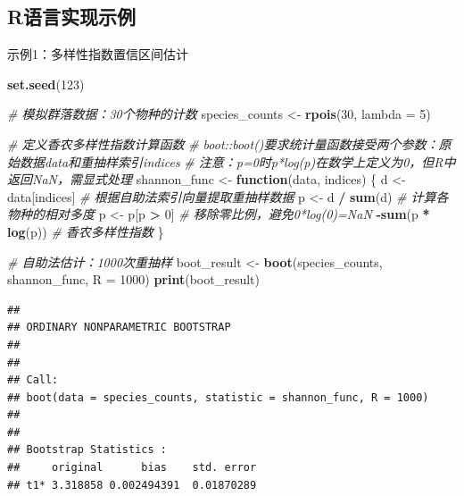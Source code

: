 \documentclass[
  twoside,12pt,fontset=none]{ctexbook}
\newenvironment{Shaded}{\begin{snugshade}}{\end{snugshade}}
\newcommand{\AttributeTok}[1]{\textcolor[rgb]{0.13,0.29,0.53}{#1}}
\newcommand{\CommentTok}[1]{\textcolor[rgb]{0.56,0.35,0.01}{\textit{#1}}}
\newcommand{\ControlFlowTok}[1]{\textcolor[rgb]{0.13,0.29,0.53}{\textbf{#1}}}
\newcommand{\DecValTok}[1]{\textcolor[rgb]{0.00,0.00,0.81}{#1}}
\newcommand{\FunctionTok}[1]{\textcolor[rgb]{0.13,0.29,0.53}{\textbf{#1}}}
\newcommand{\NormalTok}[1]{#1}
\newcommand{\OtherTok}[1]{\textcolor[rgb]{0.56,0.35,0.01}{#1}}
\newcommand{\SpecialCharTok}[1]{\textcolor[rgb]{0.81,0.36,0.00}{\textbf{#1}}}
\begin{document}
\hypertarget{rux8bedux8a00ux5b9eux73b0ux793aux4f8b-1}{%
\subsection{R语言实现示例}\label{rux8bedux8a00ux5b9eux73b0ux793aux4f8b-1}}

示例1：多样性指数置信区间估计

\begin{Shaded}
\begin{Highlighting}[]
\FunctionTok{set.seed}\NormalTok{(}\DecValTok{123}\NormalTok{)}

\CommentTok{\# 模拟群落数据：30个物种的计数}
\NormalTok{species\_counts }\OtherTok{\textless{}{-}} \FunctionTok{rpois}\NormalTok{(}\DecValTok{30}\NormalTok{, }\AttributeTok{lambda =} \DecValTok{5}\NormalTok{)}

\CommentTok{\# 定义香农多样性指数计算函数}
\CommentTok{\# boot::boot()要求统计量函数接受两个参数：原始数据data和重抽样索引indices}
\CommentTok{\# 注意：p=0时p*log(p)在数学上定义为0，但R中返回NaN，需显式处理}
\NormalTok{shannon\_func }\OtherTok{\textless{}{-}} \ControlFlowTok{function}\NormalTok{(data, indices) \{}
\NormalTok{  d }\OtherTok{\textless{}{-}}\NormalTok{ data[indices]             }\CommentTok{\# 根据自助法索引向量提取重抽样数据}
\NormalTok{  p }\OtherTok{\textless{}{-}}\NormalTok{ d }\SpecialCharTok{/} \FunctionTok{sum}\NormalTok{(d)                }\CommentTok{\# 计算各物种的相对多度}
\NormalTok{  p }\OtherTok{\textless{}{-}}\NormalTok{ p[p }\SpecialCharTok{\textgreater{}} \DecValTok{0}\NormalTok{]                  }\CommentTok{\# 移除零比例，避免0*log(0)=NaN}
  \SpecialCharTok{{-}}\FunctionTok{sum}\NormalTok{(p }\SpecialCharTok{*} \FunctionTok{log}\NormalTok{(p))               }\CommentTok{\# 香农多样性指数}
\NormalTok{\}}

\CommentTok{\# 自助法估计：1000次重抽样}
\NormalTok{boot\_result }\OtherTok{\textless{}{-}} \FunctionTok{boot}\NormalTok{(species\_counts, shannon\_func, }\AttributeTok{R =} \DecValTok{1000}\NormalTok{)}
\FunctionTok{print}\NormalTok{(boot\_result)}
\end{Highlighting}
\end{Shaded}

\begin{verbatim}
## 
## ORDINARY NONPARAMETRIC BOOTSTRAP
## 
## 
## Call:
## boot(data = species_counts, statistic = shannon_func, R = 1000)
## 
## 
## Bootstrap Statistics :
##     original      bias    std. error
## t1* 3.318858 0.002494391  0.01870289
\end{verbatim}
\end{document}
